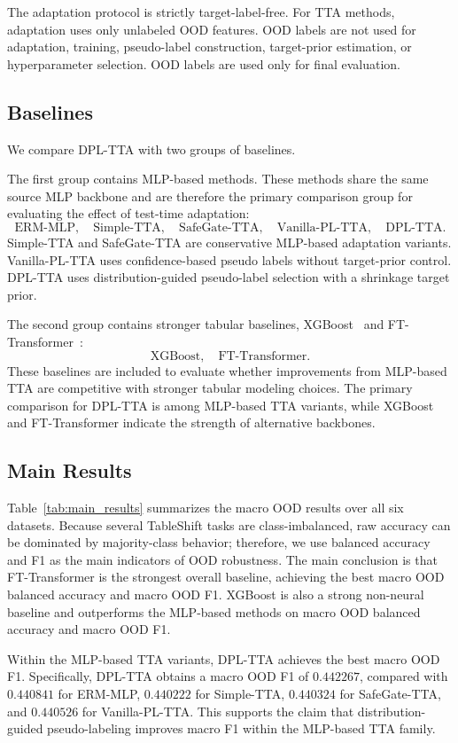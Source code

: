 \documentclass{article}
\begin{document}
The adaptation protocol is strictly target-label-free. For TTA methods, adaptation uses only unlabeled OOD features. OOD labels are not used for adaptation, training, pseudo-label construction, target-prior estimation, or hyperparameter selection. OOD labels are used only for final evaluation.

\subsection{Baselines}

We compare DPL-TTA with two groups of baselines.

The first group contains MLP-based methods. These methods share the same source MLP backbone and are therefore the primary comparison group for evaluating the effect of test-time adaptation:
\[
\text{ERM-MLP}, \quad
\text{Simple-TTA}, \quad
\text{SafeGate-TTA}, \quad
\text{Vanilla-PL-TTA}, \quad
\text{DPL-TTA}.
\]
Simple-TTA and SafeGate-TTA are conservative MLP-based adaptation variants. Vanilla-PL-TTA uses confidence-based pseudo labels without target-prior control. DPL-TTA uses distribution-guided pseudo-label selection with a shrinkage target prior.

The second group contains stronger tabular baselines, XGBoost~\citep{chen2016xgboost} and FT-Transformer~\citep{gorishniy2021revisiting}:
\[
\text{XGBoost}, \quad \text{FT-Transformer}.
\]
These baselines are included to evaluate whether improvements from MLP-based TTA are competitive with stronger tabular modeling choices. The primary comparison for DPL-TTA is among MLP-based TTA variants, while XGBoost and FT-Transformer indicate the strength of alternative backbones.

\subsection{Main Results}

Table~\ref{tab:main_results} summarizes the macro OOD results over all six datasets. Because several TableShift tasks are class-imbalanced, raw accuracy can be dominated by majority-class behavior; therefore, we use balanced accuracy and F1 as the main indicators of OOD robustness. The main conclusion is that FT-Transformer is the strongest overall baseline, achieving the best macro OOD balanced accuracy and macro OOD F1. XGBoost is also a strong non-neural baseline and outperforms the MLP-based methods on macro OOD balanced accuracy and macro OOD F1.

Within the MLP-based TTA variants, DPL-TTA achieves the best macro OOD F1. Specifically, DPL-TTA obtains a macro OOD F1 of $0.442267$, compared with $0.440841$ for ERM-MLP, $0.440222$ for Simple-TTA, $0.440324$ for SafeGate-TTA, and $0.440526$ for Vanilla-PL-TTA. This supports the claim that distribution-guided pseudo-labeling improves macro F1 within the MLP-based TTA family.
\end{document}
